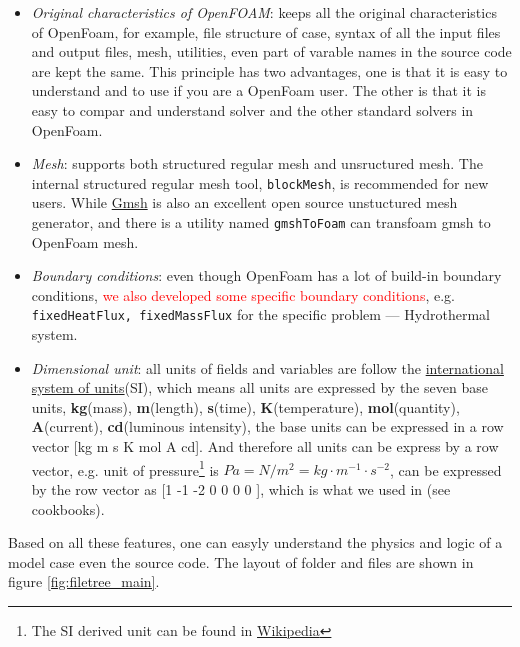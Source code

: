 \begin{itemize}
	\item  \textit{Original characteristics of OpenFOAM}: \foam keeps all the original characteristics of OpenFoam, for example, file structure of case, syntax of all the input files and output files, mesh, utilities, even part of varable names in the source code are kept the same. 
	This principle has two advantages, one is that it is easy to understand and to use \foam if you are a OpenFoam user. The other is that it is easy to compar and understand \foam solver and the other standard solvers in OpenFoam.
	
	\item  \textit{Mesh}: \foam supports both structured regular mesh and unsructured mesh. 
	The internal structured regular mesh tool, \texttt{blockMesh},  is recommended for new users. While \href{http://gmsh.info}{Gmsh} is also an excellent open source unstuctured mesh generator, and there is a utility named \texttt{gmshToFoam} can transfoam gmsh to OpenFoam mesh.
	
	\item  \textit{Boundary conditions}: even though OpenFoam has a lot of build-in boundary conditions, \textcolor{red}{we also developed some specific boundary conditions}, e.g. \texttt{fixedHeatFlux, fixedMassFlux} 
	for the specific problem --- Hydrothermal system.
	
	\item \textit{Dimensional unit}: all units of fields and variables are follow the \href{https://en.wikipedia.org/wiki/International_System_of_Units}{international system of units}(SI), 
	which means all units are expressed by the seven base units, \textbf{kg}(mass), \textbf{m}(length), \textbf{s}(time), \textbf{K}(temperature), \textbf{mol}(quantity), \textbf{A}(current), \textbf{cd}(luminous intensity), the base units can be expressed in a row vector [kg m s K mol A cd].
	And therefore all units can be express by a row vector, e.g. unit of pressure\footnote{The SI derived unit can be found in \href{https://en.wikipedia.org/wiki/SI_derived_unit}{Wikipedia}} is $Pa=N/m^2=kg\cdot m^{-1} \cdot s^{-2}$, can be expressed by the row vector as [1 -1 -2 0 0 0 0 ], which is what we used in \foam (see cookbooks).
\end{itemize}

Based on all these features, one can easyly understand the physics and logic of a model case even the source code. The layout of folder and files are shown in figure \ref{fig:filetree_main}.


